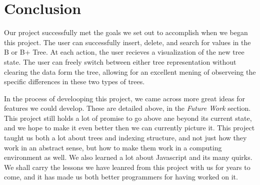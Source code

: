 \section{Conclusion}

Our project successfully met the goals we set out to accomplish when
we began this project. The user can successfully insert, delete, and
search for values in the B or B+ Tree. At each action, the user
recieves a visualization of the new tree state.  The user can freely
switch between either tree representation without clearing the data
form the tree, allowing for an excellent mening of observeing the
specific differences in these two types of trees.

In the process of develooping this project, we came across more great
ideas for features we could develop. These are detailed above, in the
\textit{Future Work} section.  This project still holds a lot of
promise to go above ane beyond its current state, and we hope to make
it even better then we can currently picture it.  This project taught
us both a lot about trees and indexing structure, and not just how
they work in an abstract sense, but how to make them work in a
computing environment as well. We also learned a lot about Javascript
and its many quirks.  We shall carry the lessons we have leanred from
this project with us for years to come, and it has made us both better
programmers for having worked on it.
